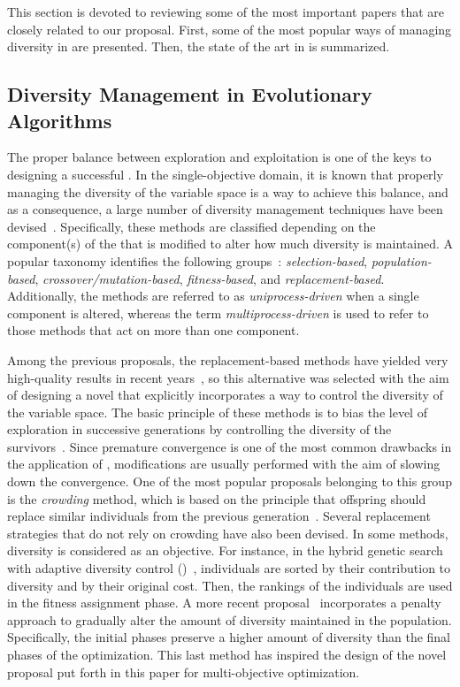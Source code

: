 This section is devoted to reviewing some of the most important papers that are closely related to our proposal.
%
First, some of the most popular ways of managing diversity in \EAS{} are presented.
%
Then, the state of the art in \MOEAS{} is summarized.

\subsection{Diversity Management in Evolutionary Algorithms}

The proper balance between exploration and exploitation is one of the keys to designing a successful \EAS{}.
%
In the single-objective domain, it is known that properly managing the diversity of the variable space is a way to achieve this balance,
and as a consequence, a large number of diversity management techniques have been devised~\cite{Mohan:14}.
%
Specifically, these methods are classified depending on the component(s) of the \EA{} that is modified to alter how much diversity is maintained.
%
A popular taxonomy identifies the following groups~\cite{Joel:Crepinsek}: \textit{selection-based}, \textit{population-based}, 
\textit{crossover/mutation-based}, \textit{fitness-based}, and \textit{replacement-based}.
%
Additionally, the methods are referred to as \textit{uniprocess-driven} when a single component is altered, whereas the term
\textit{multiprocess-driven} is used to refer to those methods that act on more than one component.

Among the previous proposals, the replacement-based methods have yielded very high-quality results in recent years~\cite{Segura:17}, so
this alternative was selected with the aim of designing a novel \MOEA{} that explicitly incorporates a way to control the diversity 
of the variable space.
%
The basic principle of these methods is to bias the level of exploration in successive generations by 
controlling the diversity of the survivors~\cite{Segura:17}.
%
Since premature convergence is one of the most common drawbacks in the application of \EAS{}, 
modifications are usually performed with the aim of slowing down the convergence.
%
One of the most popular proposals belonging to this group is the \textit{crowding} method, which
is based on the principle that offspring should replace similar individuals from the previous generation~\cite{Mengshoel:14}.
%
Several replacement strategies that do not rely on crowding have also been devised.
%
In some methods, diversity is considered as an objective.
%
For instance, in the hybrid genetic search with adaptive diversity control (\HGSADC{})~\cite{Vidal:13}, individuals are sorted 
by their contribution to diversity and by their original cost.
%
Then, the rankings of the individuals are used in the fitness assignment phase.
%
A more recent proposal~\cite{Segura:17} incorporates a penalty approach to gradually alter the amount of diversity 
maintained in the population.
%
Specifically, the initial phases preserve a higher amount of diversity than the final phases of the optimization.
%
This last method has inspired the design of the novel proposal put forth in this paper for multi-objective optimization.
%

